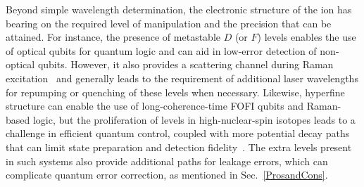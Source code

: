 \documentclass[%
reprint,
 amsmath,amssymb,
]{revtex4-1}
\begin{document}

Beyond simple wavelength determination, the electronic structure of the ion has bearing on the required level of manipulation and the precision that can be attained.  For instance, the presence of metastable $D$ (or $F$) levels enables the use of optical qubits for quantum logic and can aid in low-error detection of non-optical qubits.  However, it also provides a scattering channel during Raman excitation~\cite{PhysRevA.75.042329_2007} and generally leads to the requirement of additional laser wavelengths for repumping or quenching of these levels when necessary.  Likewise, hyperfine structure can enable the use of long-coherence-time FOFI qubits and Raman-based logic, but the proliferation of levels in high-nuclear-spin isotopes leads to a challenge in efficient quantum control, coupled with more potential decay paths that can limit state preparation and detection fidelity~\cite{PhysRevA.79.020304}.  The extra levels present in such systems also provide additional paths for leakage errors, which can complicate quantum error correction, as mentioned in Sec.~\ref{ProsandCons}.
\end{document}
